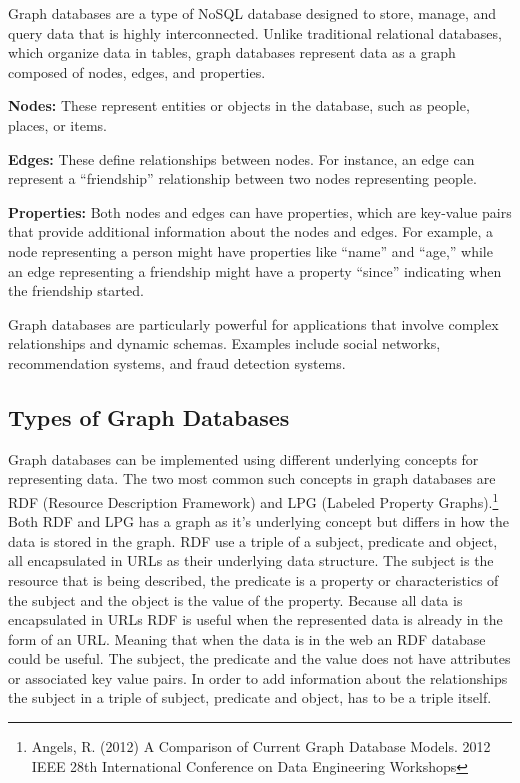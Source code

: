 Graph databases are a type of NoSQL database designed to store, manage, and query data that is highly interconnected. Unlike traditional relational databases, which organize data in tables, graph databases represent data as a graph composed of nodes, edges, and properties.

\textbf{Nodes:} These represent entities or objects in the database, such as people, places, or items.

\textbf{Edges:} These define relationships between nodes. For instance, an edge can represent a ``friendship'' relationship between two nodes representing people.

\textbf{Properties:} Both nodes and edges can have properties, which are key-value pairs that provide additional information about the nodes and edges. For example, a node representing a person might have properties like ``name'' and ``age,'' while an edge representing a friendship might have a property ``since'' indicating when the friendship started.

Graph databases are particularly powerful for applications that involve complex relationships and dynamic schemas. Examples include social networks, recommendation systems, and fraud detection systems.

\subsection{Types of Graph Databases}

Graph databases can be implemented using different underlying concepts for representing data. The two most common such concepts in graph databases are RDF (Resource Description Framework) and LPG (Labeled Property Graphs).\footnote{Angels, R. (2012) A Comparison of Current Graph Database Models. 2012 IEEE 28th International Conference on Data Engineering Workshops}
Both RDF and LPG has a graph as it's underlying concept but differs in how the data is stored in the graph. RDF use a triple of a subject, predicate and object, all encapsulated in URLs as their underlying data structure. The subject is the resource that is being described, the predicate is a property or characteristics of the subject and the object is the value of the property. Because all data is encapsulated in URLs RDF is useful when the represented data is already in the form of an URL. Meaning that when the data is in the web an RDF database could be useful. The subject, the predicate and the value does not have attributes or associated key value pairs. In order to add information about the relationships the subject in a triple of subject, predicate and object, has to be a triple itself. 

